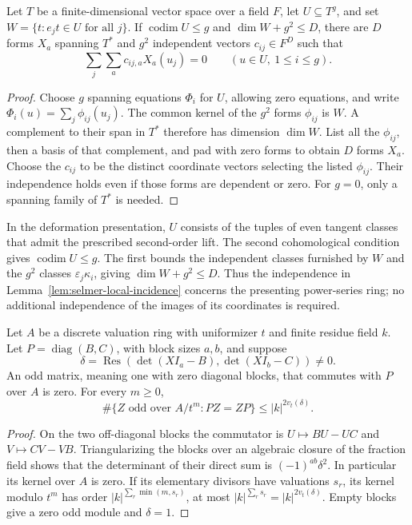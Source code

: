 \begin{lemma}
\label{lem:selmer-padded-relations}
Let $T$ be a finite-dimensional vector space over a field $F$, let
$U\subseteq T^g$, and set $W=\{t:e_jt\in U\text{ for all }j\}$.
If $\operatorname{codim}U\leq g$ and $\dim W+g^2\leq D$, there are
$D$ forms $X_a$ spanning $T^*$ and $g^2$ independent vectors
$c_{ij}\in F^D$ such that
\[
             \sum_j\sum_a c_{ij,a}X_a(u_j)=0
             \qquad(u\in U,\ 1\leq i\leq g).
\]
\end{lemma}

\begin{proof}
Choose $g$ spanning equations $\Phi_i$ for $U$, allowing zero equations,
and write $\Phi_i(u)=\sum_j\phi_{ij}(u_j)$. The common kernel of the
$g^2$ forms $\phi_{ij}$ is $W$. A complement to their span in $T^*$
therefore has dimension $\dim W$. List all the $\phi_{ij}$, then
a basis of that complement, and pad with zero forms to obtain $D$
forms $X_a$. Choose the $c_{ij}$ to be the distinct coordinate
vectors selecting the listed $\phi_{ij}$. Their independence holds
even if those forms are dependent or zero. For $g=0$, only a spanning
family of $T^*$ is needed.
\end{proof}

In the deformation presentation, $U$ consists of the tuples of even
tangent classes that admit the prescribed second-order lift. The
second cohomological condition gives $\operatorname{codim}U\leq g$.
The first bounds the independent classes furnished by $W$ and the
$g^2$ classes $\varepsilon_j\kappa_i$, giving $\dim W+g^2\leq D$.
Thus the independence in Lemma~\ref{lem:selmer-local-incidence}
concerns the presenting power-series ring; no additional independence
of the images of its coordinates is required.

\begin{lemma}
\label{lem:selmer-block-resultant}
Let $A$ be a discrete valuation ring with uniformizer $t$ and finite
residue field $k$. Let $P=\operatorname{diag}(B,C)$, with block sizes
$a,b$, and suppose
\[
 \delta=\operatorname{Res}(\det(XI_a-B),\det(XI_b-C))\ne0.
\]
An odd matrix, meaning one with zero diagonal blocks, that commutes
with $P$ over $A$ is zero. For every $m\geq0$,
\[
 \#\{Z\text{ odd over }A/t^m:PZ=ZP\}\leq |k|^{2v_t(\delta)}.
\]
\end{lemma}

\begin{proof}
On the two off-diagonal blocks the commutator is $U\mapsto BU-UC$
and $V\mapsto CV-VB$. Triangularizing the blocks over an algebraic
closure of the fraction field shows that the determinant of their
direct sum is $(-1)^{ab}\delta^2$. In particular its kernel over $A$
is zero. If its elementary divisors have valuations $s_r$, its kernel
modulo $t^m$ has order $|k|^{\sum_r\min(m,s_r)}$, at most
$|k|^{\sum_rs_r}=|k|^{2v_t(\delta)}$. Empty blocks give a zero odd
module and $\delta=1$.
\end{proof}

